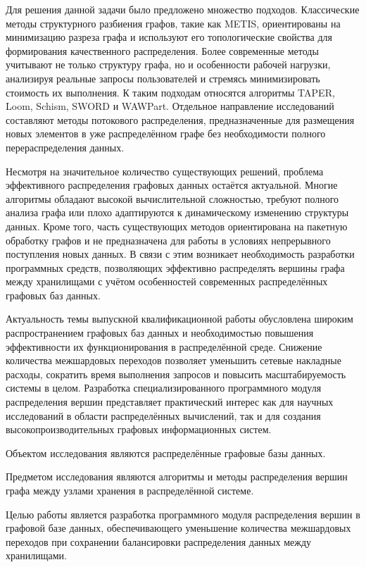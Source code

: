 Для решения данной задачи было предложено множество подходов. Классические методы структурного разбиения графов, такие как METIS, ориентированы на минимизацию разреза графа и используют его топологические свойства для формирования качественного распределения. Более современные методы учитывают не только структуру графа, но и особенности рабочей нагрузки, анализируя реальные запросы пользователей и стремясь минимизировать стоимость их выполнения. К таким подходам относятся алгоритмы TAPER, Loom, Schism, SWORD и WAWPart. Отдельное направление исследований составляют методы потокового распределения, предназначенные для размещения новых элементов в уже распределённом графе без необходимости полного перераспределения данных.

Несмотря на значительное количество существующих решений, проблема эффективного распределения графовых данных остаётся актуальной. Многие алгоритмы обладают высокой вычислительной сложностью, требуют полного анализа графа или плохо адаптируются к динамическому изменению структуры данных. Кроме того, часть существующих методов ориентирована на пакетную обработку графов и не предназначена для работы в условиях непрерывного поступления новых данных. В связи с этим возникает необходимость разработки программных средств, позволяющих эффективно распределять вершины графа между хранилищами с учётом особенностей современных распределённых графовых баз данных.

Актуальность темы выпускной квалификационной работы обусловлена широким распространением графовых баз данных и необходимостью повышения эффективности их функционирования в распределённой среде. Снижение количества межшардовых переходов позволяет уменьшить сетевые накладные расходы, сократить время выполнения запросов и повысить масштабируемость системы в целом. Разработка специализированного программного модуля распределения вершин представляет практический интерес как для научных исследований в области распределённых вычислений, так и для создания высокопроизводительных графовых информационных систем.

Объектом исследования являются распределённые графовые базы данных.

Предметом исследования являются алгоритмы и методы распределения вершин графа между узлами хранения в распределённой системе.

Целью работы является разработка программного модуля распределения вершин в графовой базе данных, обеспечивающего уменьшение количества межшардовых переходов при сохранении балансировки распределения данных между хранилищами.

